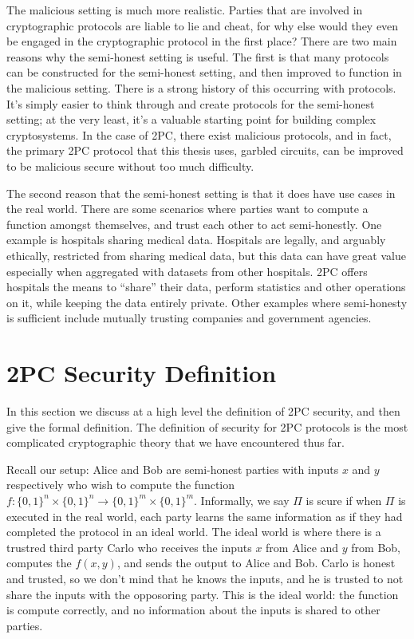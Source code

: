 The malicious setting is much more realistic. 
Parties that are involved in cryptographic protocols are liable to lie and cheat, for why else would they even be engaged in the cryptographic protocol in the first place?
There are two main reasons why the semi-honest setting is useful.
The first is that many protocols can be constructed for the semi-honest setting, and then improved to function in the malicious setting.
There is a strong history of this occurring with protocols.
It's simply easier to think through and create protocols for the semi-honest setting; at the very least, it's a valuable starting point for building complex cryptosystems.
In the case of 2PC, there exist malicious protocols, and in fact, the primary 2PC protocol that this thesis uses, garbled circuits, can be improved to be malicious secure without too much difficulty. 

The second reason that the semi-honest setting is that it does have use cases in the real world.
There are some scenarios where parties want to compute a function amongst themselves, and trust each other to act semi-honestly.
One example is hospitals sharing medical data.
Hospitals are legally, and arguably ethically, restricted from sharing medical data, but this data can have great value especially when aggregated with datasets from other hospitals.
2PC offers hospitals the means to ``share'' their data, perform statistics and other operations on it, while keeping the data entirely private. 
Other examples where semi-honesty is sufficient include mutually trusting companies and government agencies.

\section{2PC Security Definition}
In this section we discuss at a high level the definition of 2PC security, and then give the formal definition. 
The definition of security for 2PC protocols is the most complicated cryptographic theory that we have encountered thus far. 

Recall our setup: Alice and Bob are semi-honest parties with inputs $x$ and $y$ respectively who wish to compute the function $f: \{0,1\}^n \times \{0,1\}^n \to \{0,1\}^m \times \{0,1\}^m$.
Informally, we say $\Pi$ is scure if when $\Pi$ is executed in the real world, each party learns the same information as if they had completed the protocol in an ideal world.
The ideal world is where there is a trustred third party Carlo who receives the inputs $x$ from Alice and $y$ from Bob, computes the $f(x,y)$, and sends the output to Alice and Bob.
Carlo is honest and trusted, so we don't mind that he knows the inputs, and he is trusted to not share the inputs with the opposoring party.
This is the ideal world: the function is compute correctly, and no information about the inputs is shared to other parties.


